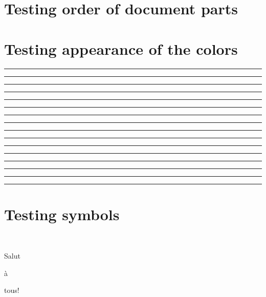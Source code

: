 \documentclass[11pt,a4paper]{article}
\begin{document}
\section{Testing order of document parts}
\loopDocumentPartNumber{}

\section{Testing appearance of the colors}
\textcolor{forest1}{\rule{10pt}{10pt}}%
\textcolor{red1}{\rule{10pt}{10pt}}%
\textcolor{blue1}{\rule{10pt}{10pt}}%
\textcolor{orange1}{\rule{10pt}{10pt}}%
\textcolor{yellow1}{\rule{10pt}{10pt}}%
\textcolor{brown1}{\rule{10pt}{10pt}}%
\textcolor{gray1}{\rule{10pt}{10pt}}%
\textcolor{gray2}{\rule{10pt}{10pt}}%
\textcolor{gray3}{\rule{10pt}{10pt}}%
\textcolor{gray4}{\rule{10pt}{10pt}}%
\textcolor{gray5}{\rule{10pt}{10pt}}%
\textcolor{gray6}{\rule{10pt}{10pt}}%
\textcolor{gray7}{\rule{10pt}{10pt}}%
\textcolor{gray8}{\rule{10pt}{10pt}}%
\textcolor{gray9}{\rule{10pt}{10pt}}%
\textcolor{gray10}{\rule{10pt}{10pt}}%

\section{Testing symbols}
\commonCircleTh~~\commonDiskTh~~\commonSquareTh~~\commonSquareFillTh~~\commonDiamondTh~~\commonDiamondFillTh~~\commonTargetTh~~

\begin{customThItemize}{}{}{}
	\item Salut
	\item à
	\item tous!
\end{customThItemize}
\end{document}

